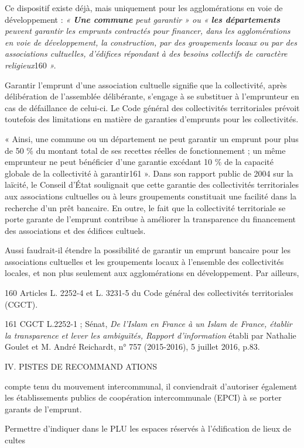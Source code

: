 Ce dispositif existe déjà, mais uniquement pour les agglomérations en
voie de développement : \emph{« \textbf{Une commune} peut garantir » ou
« \textbf{les départements} peuvent garantir les emprunts contractés
pour financer, dans les agglomérations en voie de développement, la
construction, par des groupements locaux ou par des associations
cultuelles, d'édifices répondant à des besoins collectifs de caractère
religieux}160 \emph{».}

Garantir l'emprunt d'une association cultuelle signifie que la
collectivité, après délibération de l'assemblée délibérante, s'engage à
se substituer à l'emprunteur en cas de défaillance de celui-ci. Le Code
général des collectivités territoriales prévoit toutefois des
limitations en matière de garanties d'emprunts pour les collectivités.

« Ainsi, une commune ou un département ne peut garantir un emprunt pour
plus de 50 \% du montant total de ses recettes réelles de fonctionnement
; un même emprunteur ne peut bénéficier d'une garantie excédant 10 \% de
la capacité globale de la collectivité à garantir161 ». Dans son rapport
public de 2004 sur la laïcité, le Conseil d'État soulignait que cette
garantie des collectivités territoriales aux associations cultuelles ou
à leurs groupements constituait une facilité dans la recherche d'un prêt
bancaire. En outre, le fait que la collectivité territoriale se porte
garante de l'emprunt contribue à améliorer la transparence du
financement des associations et des édifices cultuels.

Aussi faudrait-il étendre la possibilité de garantir un emprunt bancaire
pour les associations cultuelles et les groupements locaux à l'ensemble
des collectivités locales, et non plus seulement aux agglomérations en
développement. Par ailleurs,

160 Articles L. 2252-4 et L. 3231-5 du Code général des collectivités
territoriales (CGCT).

161 CGCT L.2252-1 ; Sénat, \emph{De l'Islam en France à un Islam de
France, établir la transparence et lever les ambiguïtés, Rapport
d'information} établi par Nathalie Goulet et M. André Reichardt, n° 757
(2015-2016), 5 juillet 2016, p.83.

IV. PISTES DE RECOMMAND ATIONS

compte tenu du mouvement intercommunal, il conviendrait d'autoriser
également les établissements publics de coopération intercommunale
(EPCI) à se porter garants de l'emprunt.


Permettre d'indiquer dans le PLU les espaces réservés à l'édification de
lieux de cultes


